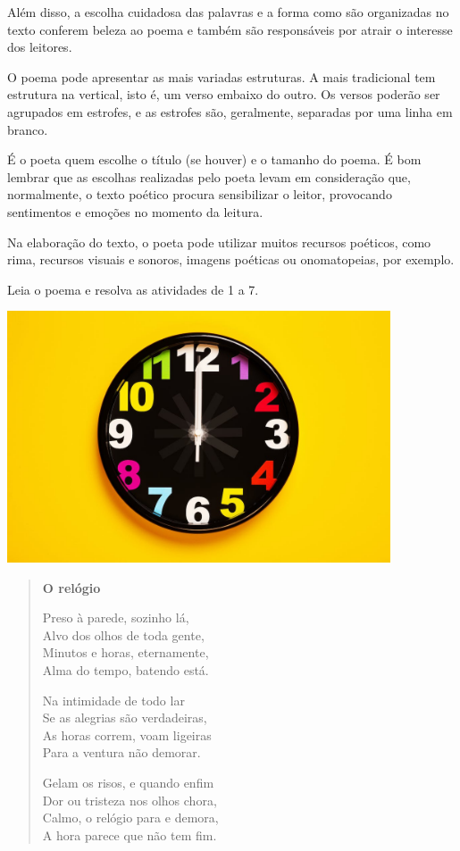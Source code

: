 {Além disso, a escolha
cuidadosa das palavras e a forma como são organizadas no texto conferem
beleza ao poema e também são responsáveis por atrair o interesse dos
leitores.

O poema pode apresentar as mais variadas estruturas. A mais tradicional tem
estrutura na vertical, isto é, um verso embaixo do outro. Os versos
poderão ser agrupados em estrofes, e as estrofes são, geralmente,
separadas por uma linha em branco.

É o poeta quem escolhe o título (se houver) e o tamanho do poema. É bom lembrar que
as escolhas realizadas pelo
poeta levam em consideração que, normalmente, o texto poético procura
sensibilizar o leitor, provocando sentimentos e emoções no momento da
leitura.

Na elaboração do texto, o poeta pode utilizar muitos recursos poéticos,
como rima, recursos visuais e sonoros, imagens poéticas ou
onomatopeias, por exemplo.
}


Leia o poema e resolva as atividades de 1 a 7.


\includegraphics[width=4.46875in,height=2.93485in]{./media/image16.jpeg}

\begin{verse}
\textbf{O relógio}

Preso à parede, sozinho lá,\\
Alvo dos olhos de toda gente,\\
Minutos e horas, eternamente,\\
Alma do tempo, batendo está.

Na intimidade de todo lar\\
Se as alegrias são verdadeiras,\\
As horas correm, voam ligeiras\\
Para a ventura não demorar.

Gelam os risos, e quando enfim\\
Dor ou tristeza nos olhos chora,\\
Calmo, o relógio para e demora,\\
A hora parece que não tem fim.
\end{verse}

